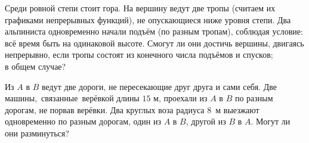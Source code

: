 \documentclass[a4paper,12pt]{article}
\begin{document}
Среди ровной степи стоит гора. На вершину ведут две тропы
(считаем их графиками непрерывных функций),
не опускающиеся ниже уровня степи.
Два альпиниста одновременно начали подъём (по разным тропам),
соблюдая условие:
всё время быть на одинаковой высоте.
Смогут ли они достичь вершины, двигаясь непрерывно, если
тропы состоят из конечного числа подъёмов и спусков;
\\ в общем случае?


Из $A$ в $B$ ведут две дороги,
не пересекающие друг друга и сами себя.
Две машины,~\hbox{связанные}~верёвкой длины $15$ м,
проехали из $A$ в $B$ по разным дорогам,
не порвав верёвки.
Два круглых воза радиуса $8$~м
выезжают одновременно по разным дорогам, один из $A$ в $B$,
другой из $B$ в $A$.
Могут ли они разминуться?



\vfill
{}
\end{document}
